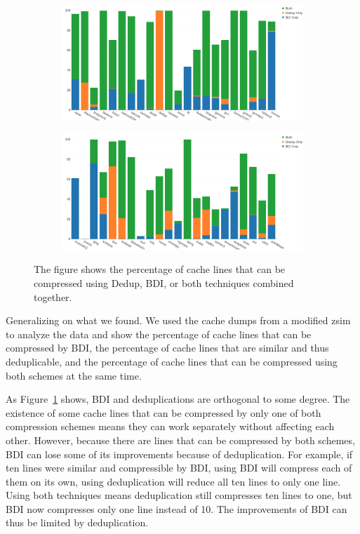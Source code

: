 \begin{figure}
    \begin{subfigure}[t]{\textwidth}
        \includegraphics[width=\textwidth]{CompPotential1.png}
    \end{subfigure}
    \begin{subfigure}[b]{\textwidth}
        \includegraphics[width=\textwidth]{CompPotential2.png}
    \end{subfigure}
    \caption[Compressible lines]{The figure shows the percentage of cache lines that can be compressed using Dedup, BDI, or both techniques combined together.}
    \label{fig:CompPossibility}
\end{figure}
Generalizing on what we found. We used the cache dumps from a modified zsim\cite{zsim} to analyze the data and show the percentage of cache lines that can be compressed by BDI, the percentage of cache lines that are similar and thus deduplicable, and the percentage of cache lines that can be compressed using both schemes at the same time.\par
As Figure~\ref{fig:CompPossibility} shows, BDI and deduplications are orthogonal to some degree. The existence of some cache lines that can be compressed by only one of both compression schemes means they can work separately without affecting each other. However, because there are lines that can be compressed by both schemes, BDI can lose some of its improvements because of deduplication. For example, if ten lines were similar and compressible by BDI, using BDI will compress each of them on its own, using deduplication will reduce all ten lines to only one line. Using both techniques means deduplication still compresses ten lines to one, but BDI now compresses only one line instead of 10. The improvements of BDI can thus be limited by deduplication.\par
